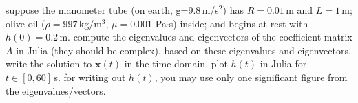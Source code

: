 \documentclass[addpoints]{exam}
\begin{document}
\begin{questions}
\question suppose the manometer tube (on earth, g=9.8\,m/s$^2$) has $R=0.01$\,m and $L=1$\,m; olive oil ($\rho=997$\,kg/m$^3$, $\mu=0.001$ Pa$\cdot$s) inside; and begins at rest with $h(0)=0.2$\,m. compute the eigenvalues and eigenvectors of the coefficient matrix $A$ in Julia (they should be complex). based on these eigenvalues and eigenvectors, write the solution to $\mathbf{x}(t)$ in the time domain. plot $h(t)$ in Julia for $t\in[0, 60]$\,s. for writing out $h(t)$, you may use only one significant figure from the eigenvalues/vectors.

 
\end{questions}
\end{document}
